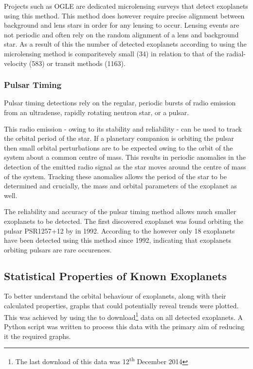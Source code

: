 \documentclass{report}
\begin{document}
Projects such as OGLE are dedicated microlensing surveys that detect exoplanets using this method. This method does however require precise alignment between background and lens stars in order for any lensing to occur. Lensing events are not periodic and often rely on the random alignment of a lens and background star. As a result of this the number of detected exoplanets according to \textcite{exo} using the microlensing method is comparitevely small (34) in relation to that of the radial-velocity (583) or transit methods (1163). 

\subsubsection{Pulsar Timing}
Pulsar timing detections rely on the regular, periodic bursts of radio emission from an ultradense, rapidly rotating neutron star, or a pulsar.

This radio emission - owing to its stability and reliability - can be used to track the orbital period of the star. If a planetary companion is orbiting the pulsar then small orbital perturbations are to be expected owing to the orbit of the system about a common centre of mass. This results in periodic anomalies in the detection of the emitted radio signal as the star moves around the centre of mass of the system. Tracking these anomalies allows the period of the star to be determined and crucially, the mass and orbital parameters of the exoplanet as well.

The reliability and accuracy of the pulsar timing method allows much smaller exoplanets to be detected. The first discovered exoplanet was found orbiting the pulsar PSR1257+12 by \citeauthor{first} in 1992. According to the \textcite{exo} however only 18 exoplanets have been detected using this method since 1992, indicating that exoplanets orbiting pulsars are rare occurences.



\subsection{Statistical Properties of Known Exoplanets}
To better understand the orbital behaviour of exoplanets, along with their calculated properties, graphs that could potentially reveal trends were plotted. This was achieved by using the \textcite{exo} to download\footnote{The last download of this data was 12\textsuperscript{th} December 2014} data on all detected exoplanets. A Python script was written to process this data with the primary aim of reducing it the required graphs.
\end{document}
